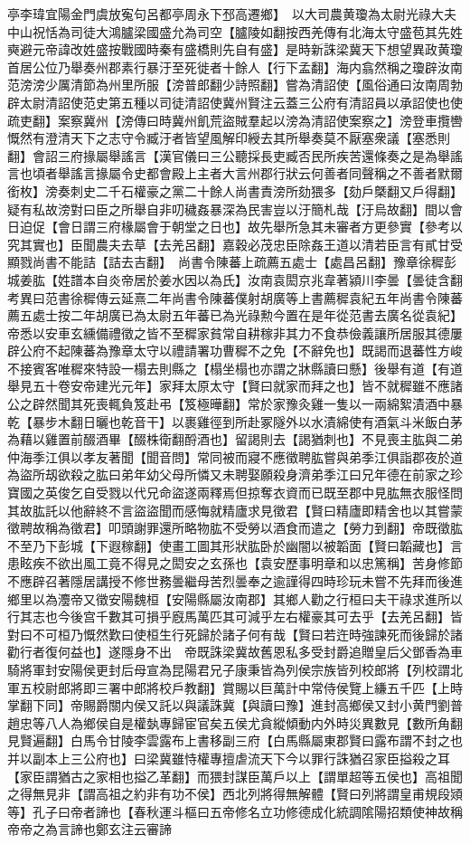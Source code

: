 亭李瑋宜陽金門虞放寃句呂都亭周永下邳高遷鄉】　以大司農黄瓊為太尉光祿大夫中山祝恬為司徒大鴻臚梁國盛允為司空【臚陵如翻按西羌傳有北海太守盛苞其先姓奭避元帝諱改姓盛按戰國時秦有盛橋則先自有盛】是時新誅梁冀天下想望異政黄瓊首居公位乃舉奏州郡素行暴汙至死徙者十餘人【行下孟翻】海内翕然稱之瓊辟汝南范滂滂少厲清節為州里所服【滂普郎翻少詩照翻】嘗為清詔使【風俗通曰汝南周勃辟太尉清詔使范史第五種以司徒清詔使冀州賢注云蓋三公府有清詔員以承詔使也使疏吏翻】案察冀州【滂傳曰時冀州飢荒盜賊羣起以滂為清詔使案察之】滂登車攬轡慨然有澄清天下之志守令臧汙者皆望風解印綬去其所舉奏莫不厭塞衆議【塞悉則翻】會詔三府掾屬舉謠言【漢官儀曰三公聽採長吏臧否民所疾苦還條奏之是為舉謠言也頃者舉謠言掾屬令史都會殿上主者大言州郡行狀云何善者同聲稱之不善者默爾銜枚】滂奏刺史二千石權豪之黨二十餘人尚書責滂所劾猥多【劾戶槩翻又戶得翻】疑有私故滂對曰臣之所舉自非叨穢姦暴深為民害豈以汙簡札哉【汙烏故翻】間以會日迫促【會日謂三府椽屬會于朝堂之日也】故先舉所急其未審者方更參實【參考以究其實也】臣聞農夫去草【去羌呂翻】嘉穀必茂忠臣除姦王道以清若臣言有貳甘受顯戮尚書不能詰【詰去吉翻】　尚書令陳蕃上疏薦五處士【處昌呂翻】豫章徐穉彭城姜肱【姓譜本自炎帝居於姜水因以為氏】汝南袁閎京兆韋著潁川李曇【曇徒含翻　考異曰范書徐穉傳云延熹二年尚書令陳蕃僕射胡廣等上書薦穉袁紀五年尚書令陳蕃薦五處士按二年胡廣已為太尉五年蕃已為光祿勲今置在是年從范書去廣名從袁紀】帝悉以安車玄纁備禮徵之皆不至穉家貧常自耕稼非其力不食恭儉義讓所居服其德屢辟公府不起陳蕃為豫章太守以禮請署功曹穉不之免【不辭免也】既謁而退蕃性方峻不接賓客唯穉來特設一榻去則縣之【榻坐榻也亦謂之牀縣讀曰懸】後舉有道【有道舉見五十卷安帝建光元年】家拜太原太守【賢曰就家而拜之也】皆不就穉雖不應諸公之辟然聞其死喪輒負笈赴弔【笈極曄翻】常於家豫灸雞一隻以一兩綿絮漬酒中暴乾【暴步木翻日曬也乾音干】以裹雞徑到所赴冢隧外以水漬綿使有酒氣斗米飯白茅為藉以雞置前醊酒畢【醊株衛翻酹酒也】留謁則去【謁猶刺也】不見喪主肱與二弟仲海季江俱以孝友著聞【聞音問】常同被而寢不應徵聘肱嘗與弟季江俱詣郡夜於道為盜所刼欲殺之肱曰弟年幼父母所憐又未聘娶願殺身濟弟季江曰兄年德在前家之珍寶國之英俊乞自受戮以代兄命盜遂兩釋焉但掠奪衣資而已既至郡中見肱無衣服怪問其故肱託以他辭終不言盜盜聞而感悔就精廬求見徵君【賢曰精廬即精舍也以其嘗蒙徵聘故稱為徵君】叩頭謝罪還所略物肱不受勞以酒食而遣之【勞力到翻】帝既徵肱不至乃下彭城【下遐稼翻】使畫工圖其形狀肱卧於幽闇以被韜面【賢曰韜藏也】言患眩疾不欲出風工竟不得見之閎安之玄孫也【袁安歷事明章和以忠篤稱】苦身修節不應辟召著隱居講授不修世務曇繼母苦烈曇奉之逾謹得四時珍玩未嘗不先拜而後進鄉里以為灋帝又徵安陽魏桓【安陽縣屬汝南郡】其鄉人勸之行桓曰夫干祿求進所以行其志也今後宫千數其可損乎廐馬萬匹其可減乎左右權豪其可去乎【去羌呂翻】皆對曰不可桓乃慨然歎曰使桓生行死歸於諸子何有哉【賢曰若迕時強諫死而後歸於諸勸行者復何益也】遂隱身不出　帝既誅梁冀故舊恩私多受封爵追贈皇后父鄧香為車騎將軍封安陽侯更封后母宣為昆陽君兄子康秉皆為列侯宗族皆列校郎將【列校謂北軍五校尉郎將即三署中郎將校戶教翻】賞賜以巨萬計中常侍侯覽上縑五千匹【上時掌翻下同】帝賜爵關内侯又託以與議誅冀【與讀曰豫】進封高鄉侯又封小黄門劉普趙忠等八人為鄉侯自是權埶專歸宦官矣五侯尤貪縱傾動内外時災異數見【數所角翻見賢遍翻】白馬令甘陵李雲露布上書移副三府【白馬縣屬東郡賢曰露布謂不封之也并以副本上三公府也】曰梁冀雖恃權專擅虐流天下今以罪行誅猶召家臣搤殺之耳【家臣謂猶古之家相也搤乙革翻】而猥封謀臣萬戶以上【謂單超等五侯也】高祖聞之得無見非【謂高祖之約非有功不侯】西北列將得無解體【賢曰列將謂皇甫規段熲等】孔子曰帝者諦也【春秋運斗樞曰五帝修名立功修德成化統調隂陽招類使神故稱帝帝之為言諦也鄭玄注云審諦